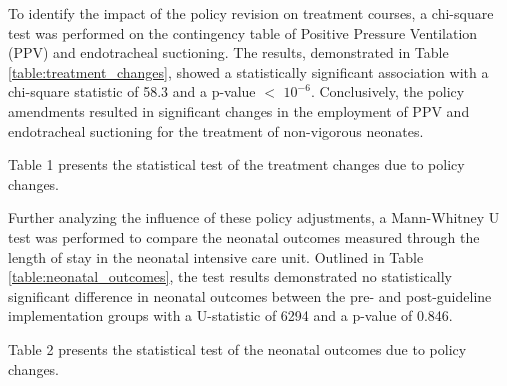 \documentclass[11pt]{article}
\begin{document}
To identify the impact of the policy revision on treatment courses, a chi-square test was performed on the contingency table of Positive Pressure Ventilation (PPV) and endotracheal suctioning. The results, demonstrated in Table \ref{table:treatment_changes}, showed a statistically significant association with a chi-square statistic of 58.3 and a p-value $<$ $10^{-6}$. Conclusively, the policy amendments resulted in significant changes in the employment of PPV and endotracheal suctioning for the treatment of non-vigorous neonates.

\begin{table}[h]
\caption{Test of treatment changes due to policy changes}
\label{table:treatment_changes}
\begin{threeparttable}
\renewcommand{\TPTminimum}{\linewidth}
\begin{tablenotes}
\footnotesize
\item Table 1 presents the statistical test of the treatment changes due to policy changes.
\end{tablenotes}
\end{threeparttable}
\end{table}


Further analyzing the influence of these policy adjustments, a Mann-Whitney U test was performed to compare the neonatal outcomes measured through the length of stay in the neonatal intensive care unit. Outlined in Table \ref{table:neonatal_outcomes}, the test results demonstrated no statistically significant difference in neonatal outcomes between the pre- and post-guideline implementation groups with a U-statistic of 6294 and a p-value of 0.846.

\begin{table}[h]
\caption{Test of neonatal outcomes due to policy changes}
\label{table:neonatal_outcomes}
\begin{threeparttable}
\renewcommand{\TPTminimum}{\linewidth}
\begin{tablenotes}
\footnotesize
\item Table 2 presents the statistical test of the neonatal outcomes due to policy changes.
\end{tablenotes}
\end{threeparttable}
\end{table}
\end{document}
